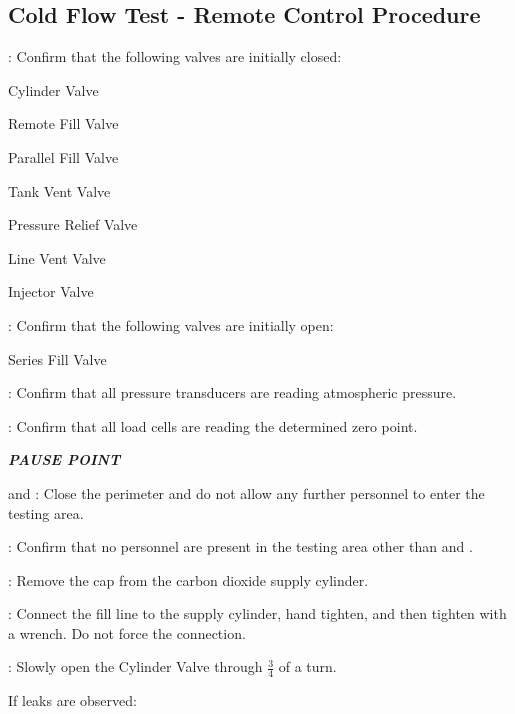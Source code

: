 \newpage
\subsection{Cold Flow Test - Remote Control Procedure}
\begin{checklist}
    \item \primary{}: Confirm that the following valves are initially closed:
    \begin{checklist}
        \item Cylinder Valve
        \item Remote Fill Valve
        \item Parallel Fill Valve
        \item Tank Vent Valve
        \item Pressure Relief Valve
        \item Line Vent Valve
        \item Injector Valve
    \end{checklist}
    \item \primary{}: Confirm that the following valves are initially open:
    \begin{checklist}
        \item Series Fill Valve
    \end{checklist}
    \item \daq{}: Confirm that all pressure transducers are reading atmospheric pressure.
    \item \daq{}: Confirm that all load cells are reading the determined zero point.
    \item \textbf{\textit{PAUSE POINT}}
    \item \peri{} and \perii{}: Close the perimeter and do not allow any further personnel to enter the testing area.
    \item \secondary: Confirm that no personnel are present in the testing area other than \primary{} and \secondary.
    \item \primary{}: Remove the cap from the carbon dioxide supply cylinder.
    \item \primary{}: Connect the fill line to the supply cylinder, hand tighten, and then tighten with a wrench. Do not force the connection.
    \item \primary{}: Slowly open the Cylinder Valve through $\frac{3}{4}$  of a turn.
    \begin{checklist}[label=$\bullet$]
        \item If leaks are observed:

\end{checklist}
\end{checklist}
